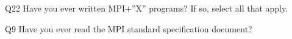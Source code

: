 \begin{description}%
\item{Q22} Have you ever written MPI+”X” programs? If so, select all that apply.%
\item{Q9} Have you ever read the MPI standard specification document?%
\end{description}%
